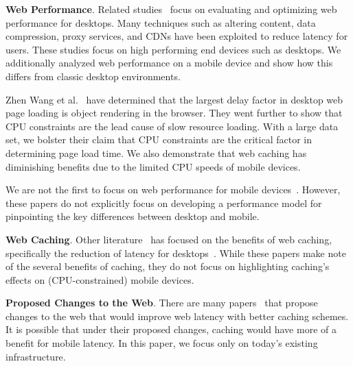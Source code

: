 \textbf{Web Performance}. Related studies~\cite{web-perf-2, web-perf-3} focus on evaluating and optimizing web performance for desktops. Many techniques such as altering content, data compression, proxy services, and CDNs have been exploited to reduce latency for users. These studies focus on high performing end devices such as desktops. We additionally analyzed web performance on a mobile device and show how this differs from classic desktop environments.

Zhen Wang et al.~\cite{CPU-plt-2, CPU-plt-3} have determined that the largest delay factor in desktop web page loading is object rendering in the browser. They went further to show that CPU constraints are the lead cause of slow resource loading.
With a large data set, we bolster their claim that CPU constraints are the critical factor in determining page load time. We also demonstrate that web caching has diminishing benefits due to the limited CPU speeds of mobile devices.

We are not the first to focus on web performance for mobile
devices~\cite{CPU-plt-2, CPU-plt-3}.
However, these papers do not explicitly focus on
developing a performance
model for pinpointing the key differences between desktop
and mobile.

\textbf{Web Caching}. Other literature~\cite{web-caching-1, web-caching-2, web-caching-8, web-caching-9} has focused on the benefits of web caching, specifically the reduction of latency for desktops~\cite{web-caching-3, web-caching-4, web-caching-5, web-caching-6, web-caching-7}.
While these papers make note of the several benefits of caching, they do not
focus on highlighting caching's effects on (CPU-constrained) mobile devices.


\textbf{Proposed Changes to the Web}. There are many
papers~\cite{web-perf-4-new-design, web-caching-4-new-design,
web-caching-5-new-design, web-caching-latency-1-new-design,
web-caching-latency-2-new-design, web-caching-latency-3-new-design,
web-caching-latency-5-new-design, web-caching-latency-6-new-design,
web-caching-latency-7-new-design} that propose changes to the web that would
improve web latency with better caching schemes. It is possible that under their proposed changes, caching would have more of a benefit for mobile latency. In this paper, we focus only on today's existing infrastructure. %

